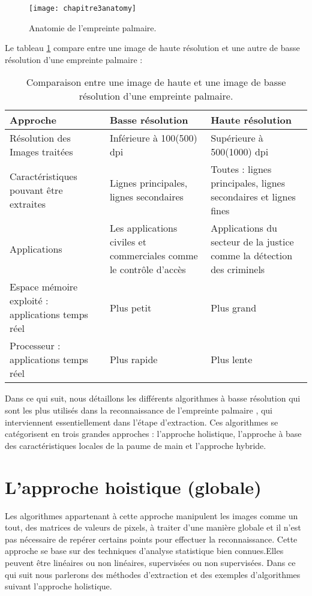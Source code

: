 \begin{center}
	\begin{figure}[H]
		\centering
		\texttt{[image: chapitre3anatomy]}
		\caption{Anatomie de l'empreinte palmaire.}
		\label{fig:chapitre3anatomy}
	\end{figure}
\end{center}
Le tableau \ref{tab:palmcomparaison} compare entre une image de haute résolution et une autre de basse résolution d'une empreinte palmaire :
\begin{table}[H]
	\centering

	\begin{tabular}{|p{5cm}|p{5cm}|p{5cm}|}
		\hline
		\textbf{Approche} & \textbf{Basse résolution} & \textbf{Haute résolution} \\ \hline
		Résolution des Images traitées & Inférieure à 100(500) dpi & Supérieure à 500(1000) dpi \\ \hline
		Caractéristiques pouvant être extraites & Lignes principales, lignes secondaires & Toutes : lignes principales, lignes secondaires et lignes fines \\ \hline
		Applications & Les applications civiles et commerciales comme le contrôle d'accès & Applications du secteur de la justice comme la détection des criminels \\ \hline
		Espace mémoire exploité : applications temps réel & Plus petit & Plus grand \\ \hline
		Processeur : applications temps réel & Plus rapide & Plus lente \\ \hline
	\end{tabular}
	\caption{Comparaison entre une image de haute et une image de basse résolution d'une empreinte palmaire.}
\label{tab:palmcomparaison}
\end{table}
Dans ce qui suit, nous détaillons les différents algorithmes à basse résolution qui sont les plus utilisés dans la reconnaissance de l'empreinte palmaire \citep{kong2002palmprint}, qui interviennent essentiellement dans l'étape d'extraction. Ces algorithmes se catégorisent en trois grandes approches : l'approche holistique, l'approche à base des caractéristiques locales de la paume de main et l'approche hybride.
\section{L'approche hoistique (globale)}
Les algorithmes appartenant à cette approche manipulent les images comme un tout, des matrices de valeurs de pixels, à traiter d'une manière globale et il n'est pas nécessaire de repérer certains points \citep{meyer2009} pour effectuer la reconnaissance. Cette approche se base sur des techniques d'analyse statistique bien connues.Elles peuvent être linéaires ou non linéaires, supervisées ou non supervisées. Dans ce qui suit nous parlerons des méthodes d'extraction et des exemples d'algorithmes suivant l'approche holistique.
